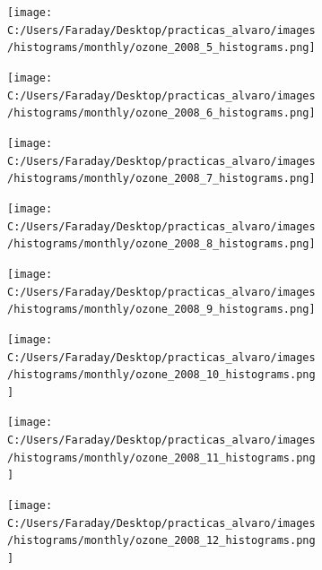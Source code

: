 \documentclass[12pt]{article}
\begin{document}
\begin{figure}[H]
\centering
\begin{subfigure}[h]{0.45\textwidth}
\texttt{[image: C:/Users/Faraday/Desktop/practicas\_alvaro/images/histograms/monthly/ozone\_2008\_5\_histograms.png]}
\caption{}
\label{fig:hist-mon-2-5-2008}
\end{subfigure}
%
\begin{subfigure}[H]{0.45\textwidth}
\texttt{[image: C:/Users/Faraday/Desktop/practicas\_alvaro/images/histograms/monthly/ozone\_2008\_6\_histograms.png]}
\caption{}
\label{fig:hist-mon-2-6-2008}
\end{subfigure}
\caption{}
\end{figure}

\newpage

\begin{figure}[H]
\centering
\begin{subfigure}[h]{0.45\textwidth}
\texttt{[image: C:/Users/Faraday/Desktop/practicas\_alvaro/images/histograms/monthly/ozone\_2008\_7\_histograms.png]}
\caption{}
\label{fig:hist-mon-2-7-2008}
\end{subfigure}
%
\begin{subfigure}[H]{0.45\textwidth}
\texttt{[image: C:/Users/Faraday/Desktop/practicas\_alvaro/images/histograms/monthly/ozone\_2008\_8\_histograms.png]}
\caption{}
\label{fig:hist-mon-2-8-2008}
\end{subfigure}
\caption{}
\end{figure}

\begin{figure}[H]
\centering
\begin{subfigure}[h]{0.45\textwidth}
\texttt{[image: C:/Users/Faraday/Desktop/practicas\_alvaro/images/histograms/monthly/ozone\_2008\_9\_histograms.png]}
\caption{}
\label{fig:hist-mon-2-9-2008}
\end{subfigure}
%
\begin{subfigure}[H]{0.45\textwidth}
\texttt{[image: C:/Users/Faraday/Desktop/practicas\_alvaro/images/histograms/monthly/ozone\_2008\_10\_histograms.png]}
\caption{}
\label{fig:hist-mon-2-10-2008}
\end{subfigure}
\caption{}
\end{figure}

\begin{figure}[H]
\centering
\begin{subfigure}[h]{0.45\textwidth}
\texttt{[image: C:/Users/Faraday/Desktop/practicas\_alvaro/images/histograms/monthly/ozone\_2008\_11\_histograms.png]}
\caption{}
\label{fig:hist-mon-2-11-2008}
\end{subfigure}
%
\begin{subfigure}[H]{0.45\textwidth}
\texttt{[image: C:/Users/Faraday/Desktop/practicas\_alvaro/images/histograms/monthly/ozone\_2008\_12\_histograms.png]}
\caption{}
\label{fig:hist-mon-2-12-2008}
\end{subfigure}
\caption{}
\end{figure}
\end{document}
